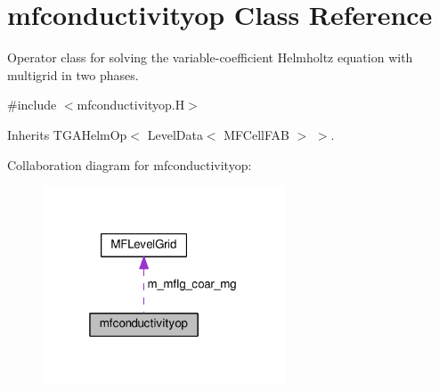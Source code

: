 \hypertarget{classmfconductivityop}{}\section{mfconductivityop Class Reference}
\label{classmfconductivityop}


Operator class for solving the variable-\/coefficient Helmholtz equation with multigrid in two phases.  




{\ttfamily \#include $<$mfconductivityop.\+H$>$}



Inherits T\+G\+A\+Helm\+Op$<$ Level\+Data$<$ M\+F\+Cell\+F\+A\+B $>$ $>$.



Collaboration diagram for mfconductivityop\+:\nopagebreak
\begin{figure}[H]
\begin{center}
\leavevmode
\includegraphics[width=205pt]{classmfconductivityop__coll__graph}
\end{center}
\end{figure}

